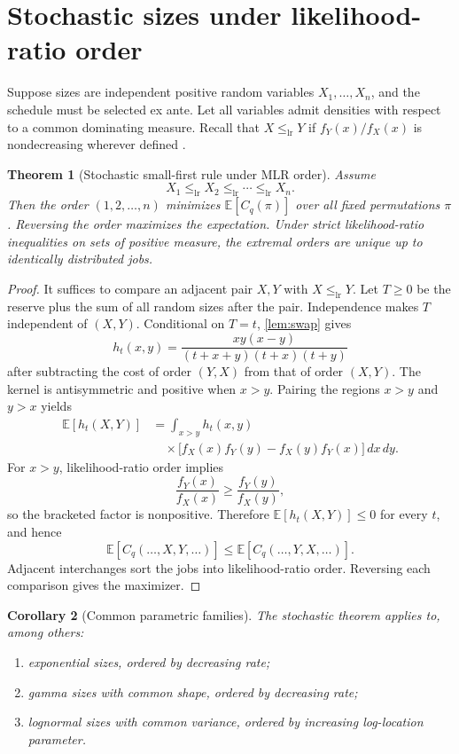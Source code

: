 \documentclass[pdflatex,iicol,sn-basic]{sn-jnl}
\theoremstyle{thmstyleone}
\newtheorem{theorem}{Theorem}[section]
\newtheorem{corollary}[theorem]{Corollary}
\theoremstyle{thmstyletwo}
\theoremstyle{thmstylethree}
\newcommand{\E}{\mathbb{E}}
\newcommand{\lr}{\le_{\mathrm{lr}}}
\begin{document}
\section{Stochastic sizes under likelihood-ratio order}
\label{sec:stochastic}

Suppose sizes are independent positive random variables \(X_1,\ldots,X_n\), and
the schedule must be selected ex ante. Let all variables admit densities with
respect to a common dominating measure. Recall that \(X\lr Y\) if
\(f_Y(x)/f_X(x)\) is nondecreasing wherever defined
\citep{ShakedShanthikumar2007}.

\begin{theorem}[Stochastic small-first rule under MLR order]
\label{thm:stochastic}
Assume
\[
X_1\lr X_2\lr\cdots\lr X_n.
\]
Then the order \((1,2,\ldots,n)\) minimizes \(\E[C_q(\pi)]\) over all fixed
permutations \(\pi\). Reversing the order maximizes the expectation. Under
strict likelihood-ratio inequalities on sets of positive measure, the extremal
orders are unique up to identically distributed jobs.
\end{theorem}

\begin{proof}
It suffices to compare an adjacent pair \(X,Y\) with \(X\lr Y\). Let \(T\ge0\)
be the reserve plus the sum of all random sizes after the pair. Independence
makes \(T\) independent of \((X,Y)\). Conditional on \(T=t\), \cref{lem:swap}
gives
\begin{equation}\label{eq:hkernel}
h_t(x,y)
=
\frac{xy(x-y)}{(t+x+y)(t+x)(t+y)}
\end{equation}
after subtracting the cost of order \((Y,X)\) from that of order \((X,Y)\). The
kernel is antisymmetric and positive when \(x>y\). Pairing the regions \(x>y\)
and \(y>x\) yields
\begin{align*}
\E[h_t(X,Y)]
&=\int_{x>y} h_t(x,y)\\
&\quad{}\times
\bigl[f_X(x)f_Y(y)-f_X(y)f_Y(x)\bigr]\,dx\,dy.
\end{align*}
For \(x>y\), likelihood-ratio order implies
\[
\frac{f_Y(x)}{f_X(x)}\ge\frac{f_Y(y)}{f_X(y)},
\]
so the bracketed factor is nonpositive. Therefore \(\E[h_t(X,Y)]\le0\) for every
\(t\), and hence
\[
\E[C_q(\ldots,X,Y,\ldots)]
\le
\E[C_q(\ldots,Y,X,\ldots)].
\]
Adjacent interchanges sort the jobs into likelihood-ratio order. Reversing each
comparison gives the maximizer.
\end{proof}

\begin{corollary}[Common parametric families]
\label{cor:families}
The stochastic theorem applies to, among others:
\begin{enumerate}[label=(\roman*),leftmargin=2em]
\item exponential sizes, ordered by decreasing rate;
\item gamma sizes with common shape, ordered by decreasing rate;
\item lognormal sizes with common variance, ordered by increasing log-location
parameter.
\end{enumerate}
\end{corollary}
\end{document}
